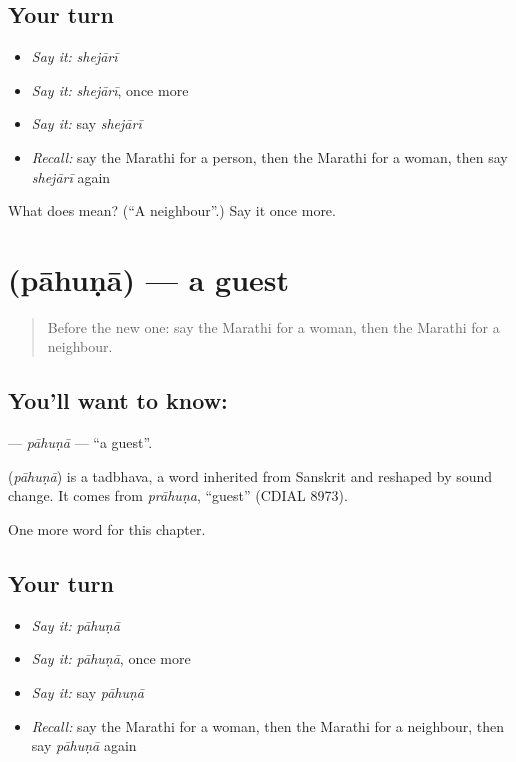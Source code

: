 \subsection*{Your turn}
\begin{itemize}
\raggedright
  \item \emph{Say it:} \emph{shejārī}
  \item \emph{Say it:} \emph{shejārī}, once more
  \item \emph{Say it:} say \emph{shejārī}
  \item \emph{Recall:} say the Marathi for a person, then the Marathi for a woman, then say \emph{shejārī} again
\end{itemize}

\begin{tcolorbox}[breakable,colback=teal!4,colframe=teal!35!black,title={Before you move on}]
What does  mean? (\textquotedblleft{}A neighbour\textquotedblright{}.) Say it once more.
\end{tcolorbox}
\section[\texorpdfstring{\mr{पाहुणा} (pāhuṇā)}{पाहुणा (pāhuṇā)}]{ (pāhuṇā) — a guest}

\label{lesson:MR-C77-pahuna}



\begin{quote}
Before the new one: say the Marathi for a woman, then the Marathi for a neighbour.
\end{quote}

\subsection*{You'll want to know: }
\textbf{} — \emph{pāhuṇā} — \textquotedblleft{}a guest\textquotedblright{}.

\begin{cousinweb}
\textbf{} (\emph{pāhuṇā}) is a tadbhava, a word inherited from Sanskrit and reshaped by sound change. It comes from \emph{prāhuṇa}, \textquotedblleft{}guest\textquotedblright{} (CDIAL 8973).
\end{cousinweb}

\begin{grammarlens}[title={What you've built}]
One more word for this chapter.
\end{grammarlens}

\subsection*{Your turn}
\begin{itemize}
\raggedright
  \item \emph{Say it:} \emph{pāhuṇā}
  \item \emph{Say it:} \emph{pāhuṇā}, once more
  \item \emph{Say it:} say \emph{pāhuṇā}
  \item \emph{Recall:} say the Marathi for a woman, then the Marathi for a neighbour, then say \emph{pāhuṇā} again
\end{itemize}

